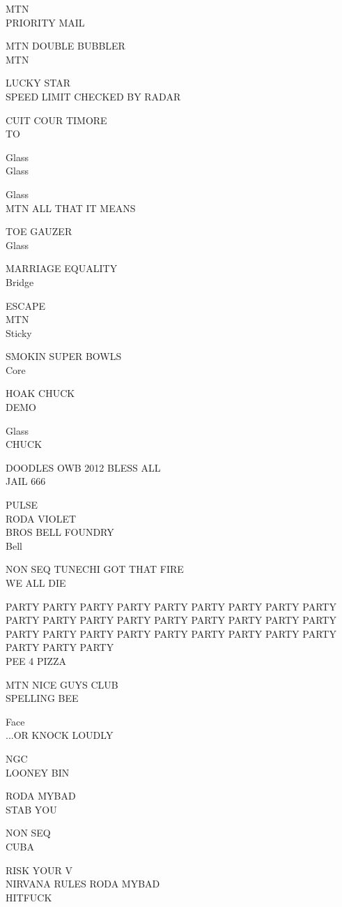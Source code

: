 \documentclass[10pt,letterpaper]{article}
\begin{document}
MTN\\
PRIORITY MAIL

MTN DOUBLE BUBBLER\\
MTN

LUCKY STAR\\
SPEED LIMIT CHECKED BY RADAR

CUIT COUR TIMORE\\
TO

Glass\\
Glass

Glass\\
MTN ALL THAT IT MEANS

TOE GAUZER\\
Glass

MARRIAGE EQUALITY\\
Bridge

ESCAPE\\
MTN\\
Sticky

SMOKIN SUPER BOWLS\\
Core

HOAK CHUCK\\
DEMO

Glass\\
CHUCK

DOODLES OWB 2012 BLESS ALL\\
JAIL 666

PULSE\\
RODA VIOLET\\
BROS BELL FOUNDRY\\
Bell

NON SEQ TUNECHI GOT THAT FIRE\\
WE ALL DIE

PARTY PARTY PARTY PARTY PARTY PARTY PARTY PARTY PARTY PARTY PARTY PARTY PARTY PARTY PARTY PARTY PARTY PARTY PARTY PARTY PARTY PARTY PARTY PARTY PARTY PARTY PARTY PARTY PARTY PARTY\\
PEE 4 PIZZA

MTN NICE GUYS CLUB\\
SPELLING BEE

Face\\
...OR KNOCK LOUDLY

NGC\\
LOONEY BIN

RODA MYBAD\\
STAB YOU

NON SEQ\\
CUBA

RISK YOUR V\\
NIRVANA RULES RODA MYBAD\\
HITFUCK
\end{document}
